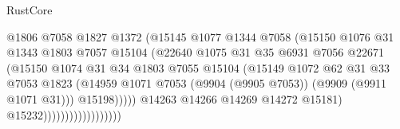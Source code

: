 \begin{lexlean}{RustCore}
\begin{coremodule}
                                          @1806
                                          @7058
                                          @1827
                                          @1372
                                          (@15145
                                            @1077
                                            @1344
                                            @7058
                                            (@15150
                                              @1076
                                              @31
                                              @1343
                                              @1803
                                              @7057
                                              @15104
                                              (@22640
                                                @1075
                                                @31
                                                @35
                                                @6931
                                                @7056
                                                @22671
                                                (@15150
                                                  @1074
                                                  @31
                                                  @34
                                                  @1803
                                                  @7055
                                                  @15104
                                                  (@15149
                                                    @1072
                                                    @62
                                                    @31
                                                    @33
                                                    @7053
                                                    @1823
                                                    (@14959
                                                      @1071
                                                      @7053
                                                      (@9904 (@9905 @7053))
                                                      (@9909 (@9911 @1071 @31)))
                                                    @15198)))))
                                          @14263
                                          @14266
                                          @14269
                                          @14272
                                          @15181)
                                        @15232))))))))))))))))))

\end{coremodule}
\end{lexlean}
